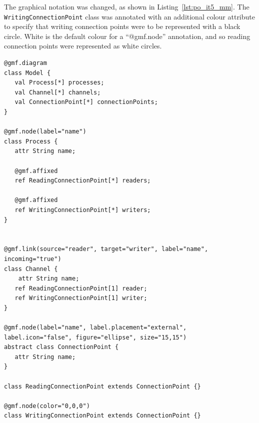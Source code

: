 The graphical notation was changed, as shown in Listing~\ref{lst:po_it5_mm}. The \texttt{Wr\-i\-ti\-ngCo\-nn\-ec\-ti\-o\-nP\-oi\-nt} class was annotated with an additional colour attribute to specify that writing connection points were to be represented with a black circle. White is the default colour for a ``@gmf.node'' annotation, and so reading connection points were represented as white circles.

\begin{lstlisting}[caption=The annotated process-oriented metamodel after the fifth iteration, label=lst:po_it5_mm, language=Emfatic]
@gmf.diagram
class Model {
   val Process[*] processes;
   val Channel[*] channels;
   val ConnectionPoint[*] connectionPoints;
}

@gmf.node(label="name")
class Process {
   attr String name;
      
   @gmf.affixed
   ref ReadingConnectionPoint[*] readers;
   
   @gmf.affixed
   ref WritingConnectionPoint[*] writers; 
}


@gmf.link(source="reader", target="writer", label="name", incoming="true")
class Channel { 
	attr String name;
   ref ReadingConnectionPoint[1] reader;
   ref WritingConnectionPoint[1] writer;
}

@gmf.node(label="name", label.placement="external", label.icon="false", figure="ellipse", size="15,15")
abstract class ConnectionPoint {
   attr String name;
}

class ReadingConnectionPoint extends ConnectionPoint {}

@gmf.node(color="0,0,0")
class WritingConnectionPoint extends ConnectionPoint {}
\end{lstlisting}


